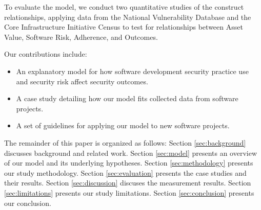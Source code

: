 To evaluate the model, we conduct two quantitative studies of the construct relationships, applying data from the National Vulnerability Database and the Core Infrastructure Initiative Census to test for relationships between Asset Value, Software Risk, Adherence, and Outcomes.
  
Our contributions include:
\begin{itemize}
\item An explanatory model for how software development security practice use and security risk affect security outcomes.
\item A case study detailing how our model fits collected data from software projects.
\item A set of guidelines for applying our model to new software projects. 
\end{itemize}
The remainder of this paper is organized as follows:  Section \ref{sec:background} discusses background and related work. Section \ref{sec:model} presents an overview of our model and its underlying hypotheses. Section \ref{sec:methodology} presents our study methodology. Section \ref{sec:evaluation} presents the case studies and their results. Section \ref{sec:discussion} discuses the measurement results. Section \ref{sec:limitations} presents our study limitations. Section \ref{sec:conclusion} presents our conclusion.
